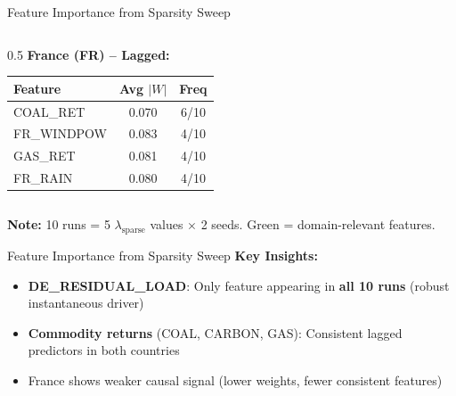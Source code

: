 \documentclass[aspectratio=169]{beamer}
\begin{document}
\begin{frame}{Feature Importance from Sparsity Sweep}
\begin{columns}
\begin{column}{0.5\textwidth}
\textbf{France (FR) -- Lagged:}
\begin{table}
\scriptsize
\begin{tabular}{l|c|c}
\toprule
\textbf{Feature} & \textbf{Avg $|W|$} & \textbf{Freq} \\
\midrule
\textcolor{reprogreen}{COAL\_RET} & 0.070 & 6/10 \\
FR\_WINDPOW & 0.083 & 4/10 \\
GAS\_RET & 0.081 & 4/10 \\
FR\_RAIN & 0.080 & 4/10 \\
\bottomrule
\end{tabular}
\end{table}
\end{column}
\end{columns}

\vspace{0.1cm}
\textbf{Note:} 10 runs = 5 $\lambda_{\text{sparse}}$ values $\times$ 2 seeds. \textcolor{reprogreen}{Green} = domain-relevant features.
\end{frame}

\begin{frame}{Feature Importance from Sparsity Sweep}
\textbf{Key Insights:}
\begin{itemize}
    \item \textbf{DE\_RESIDUAL\_LOAD}: Only feature appearing in \textbf{all 10 runs} (robust instantaneous driver)
    \item \textbf{Commodity returns} (COAL, CARBON, GAS): Consistent lagged predictors in both countries
    \item France shows weaker causal signal (lower weights, fewer consistent features)
\end{itemize}
\end{frame}
\end{document}
